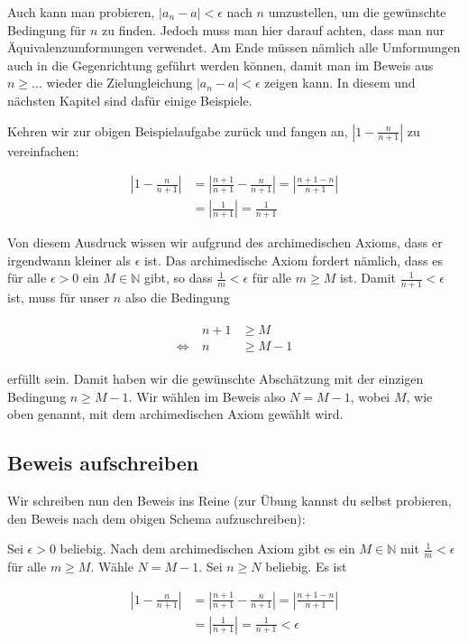 \documentclass[fontsize=9pt,
               parskip=half-,
               DIV=14,
               listof=chapterentry,
               tocflat]{scrbook}
\begin{document}
Auch kann man probieren, $|a_{n}-a|<\epsilon $ nach $n$ umzustellen, um die gewünschte Bedingung für $n$ zu finden. Jedoch muss man hier darauf achten, dass man nur Äquivalenzumformungen verwendet. Am Ende müssen nämlich alle Umformungen auch in die Gegenrichtung geführt werden können, damit man im Beweis aus $n\geq \ldots $ wieder die Zielungleichung $|a_{n}-a|<\epsilon $ zeigen kann. In diesem und nächsten Kapitel sind dafür einige Beispiele.



Kehren wir zur obigen Beispielaufgabe zurück und fangen an, $\left|1-{\tfrac {n}{n+1}}\right|$ zu vereinfachen:

\begin{align*}
\left|1-{\frac {n}{n+1}}\right|&=\left|{\frac {n+1}{n+1}}-{\frac {n}{n+1}}\right|=\left|{\frac {n+1-n}{n+1}}\right|\\[0.5em]&=\left|{\frac {1}{n+1}}\right|={\frac {1}{n+1}}
\end{align*}

Von diesem Ausdruck wissen wir aufgrund des archimedischen Axioms, dass er irgendwann kleiner als $\epsilon $ ist. Das archimedische Axiom fordert nämlich, dass es für alle $\epsilon >0$ ein $M\in \mathbb {N} $ gibt, so dass ${\tfrac {1}{m}}<\epsilon $ für alle $m\geq M$ ist. Damit ${\tfrac {1}{n+1}}<\epsilon $ ist, muss für unser $n$ also die Bedingung

\begin{align*}
{\begin{array}{rrl}&n+1&\geq M\\\Leftrightarrow \ &n&\geq M-1\end{array}}
\end{align*}

erfüllt sein. Damit haben wir die gewünschte Abschätzung mit der einzigen Bedingung $n\geq M-1$. Wir wählen im Beweis also $N=M-1$, wobei $M$, wie oben genannt, mit dem archimedischen Axiom gewählt wird.

\subsection{Beweis aufschreiben}

Wir schreiben nun den Beweis ins Reine (zur Übung kannst du selbst probieren, den Beweis nach dem obigen Schema aufzuschreiben):

\begin{proof*}
Sei $\epsilon >0$ beliebig. Nach dem archimedischen Axiom gibt es ein $M\in \mathbb {N} $ mit ${\tfrac {1}{m}}<\epsilon $ für alle $m\geq M$. Wähle $N=M-1$. Sei $n\geq N$ beliebig. Es ist

\begin{align*}
\left|1-{\frac {n}{n+1}}\right|&=\left|{\frac {n+1}{n+1}}-{\frac {n}{n+1}}\right|=\left|{\frac {n+1-n}{n+1}}\right|\\[0.5em]&=\left|{\frac {1}{n+1}}\right|={\frac {1}{n+1}}<\epsilon 
\end{align*}

\end{proof*}
\end{document}
